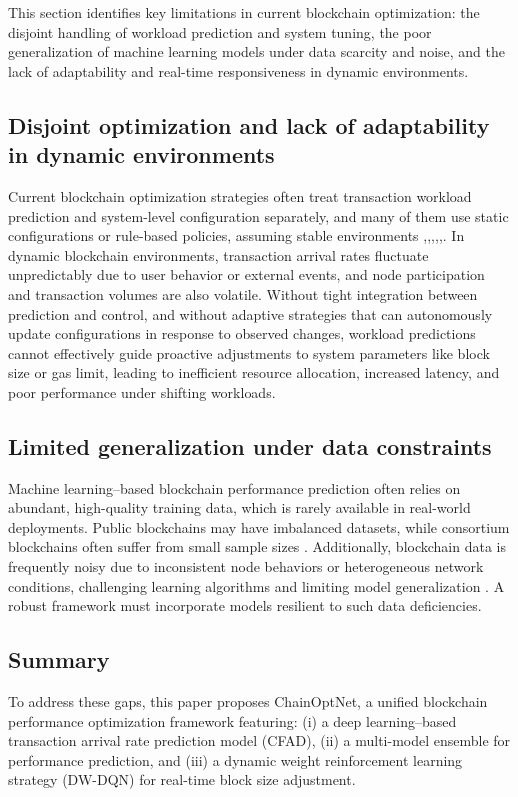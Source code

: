\documentclass[a4paper,fleqn]{cas-dc}
\begin{document}
This section identifies key limitations in current blockchain optimization: the disjoint handling of workload prediction and system tuning, the poor generalization of machine learning models under data scarcity and noise, and the lack of adaptability and real-time responsiveness in dynamic environments.

\subsection{Disjoint optimization and lack of adaptability in dynamic environments}
\vspace{6pt}
Current blockchain optimization strategies often treat transaction workload prediction and system-level configuration separately, and many of them use static configurations or rule-based policies, assuming stable environments \citep{jamil2022improving},\citep{chen2022latency},\citep{wilhelmi2022end},\citep{wang2022bpr},\citep{wang2023learningchain},\citep{leng2019manuchain}. In dynamic blockchain environments, transaction arrival rates fluctuate unpredictably due to user behavior or external events, and node participation and transaction volumes are also volatile. Without tight integration between prediction and control, and without adaptive strategies that can autonomously update configurations in response to observed changes, workload predictions cannot effectively guide proactive adjustments to system parameters like block size or gas limit, leading to inefficient resource allocation, increased latency, and poor performance under shifting workloads.

\subsection{Limited generalization under data constraints}
\vspace{6pt}
Machine learning–based blockchain performance prediction often relies on abundant, high-quality training data, which is rarely available in real-world deployments. Public blockchains may have imbalanced datasets, while consortium blockchains often suffer from small sample sizes \citep{marsalek2019tackling}. Additionally, blockchain data is frequently noisy due to inconsistent node behaviors or heterogeneous network conditions, challenging learning algorithms and limiting model generalization \citep{xu2017information}. A robust framework must incorporate models resilient to such data deficiencies.


\subsection{Summary}
\vspace{6pt}
To address these gaps, this paper proposes ChainOptNet, a unified blockchain performance optimization framework featuring: (i) a deep learning–based transaction arrival rate prediction model (CFAD), (ii) a multi-model ensemble for performance prediction, and (iii) a dynamic weight reinforcement learning strategy (DW-DQN) for real-time block size adjustment. 
\end{document}
